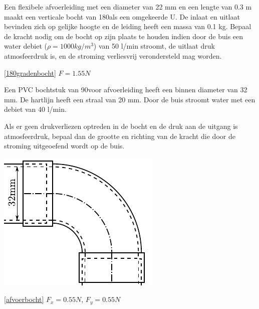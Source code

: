 \begin{toepassing}
	\label{180gradenbocht}
Een flexibele afvoerleiding met een diameter van 22 mm en een lengte van 0.3 m maakt een verticale bocht van 180\deg als een omgekeerde U. De inlaat en uitlaat bevinden zich op gelijke hoogte en de leiding heeft een massa van 0.1 kg. Bepaal de kracht nodig om de bocht op zijn plaats te houden indien door de buis een water debiet ($\rho=1000\unit{kg/m^3}$) van 50 l/min stroomt, de uitlaat druk atmosfeerdruk is, en de stroming verliesvrij verondersteld mag worden.
\end{toepassing}
\begin{antwoord}{\ref{180gradenbocht}}
	$F = 1.55\unit{N}$
\end{antwoord}
\begin{toepassing}
	\label{afvoerbocht}
Een PVC bochtstuk van 90\deg voor afvoerleiding heeft een binnen diameter van 32 mm. De hartlijn heeft een straal van 20 mm. Door de buis stroomt water met een debiet van 40 l/min.
		
Als er geen drukverliezen optreden in de bocht en de druk aan de uitgang is atmosfeerdruk, bepaal dan de grootte en richting van de kracht die door de stroming uitgeoefend wordt op de buis.

	\centering
	\includegraphics{fig/behoudsvergelijkingen/afvoerbocht}
\end{toepassing}
\begin{antwoord}{\ref{afvoerbocht}}
	$F_x = 0.55\unit{N}$, $F_y = 0.55\unit{N}$
\end{antwoord}
